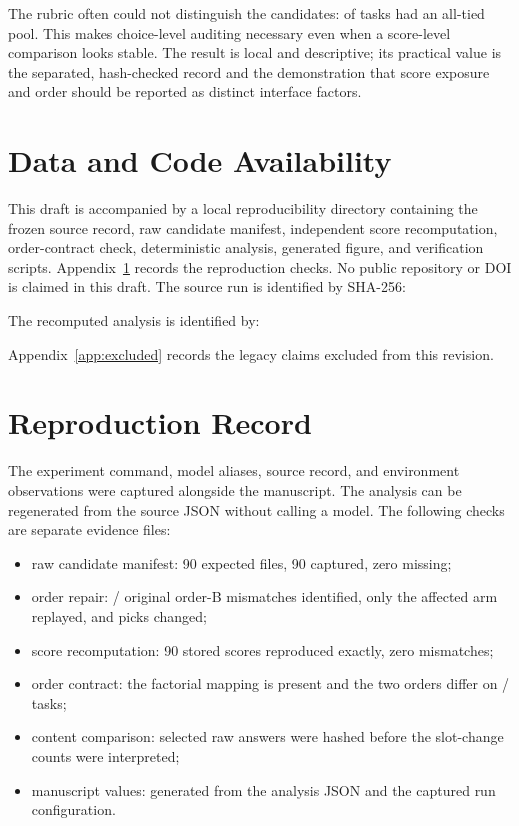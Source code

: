 \documentclass[11pt]{article}
\begin{document}
The rubric often could not distinguish the candidates: \AllTiedInstrumentTasks{} of
\DesignTasks{} tasks had an all-tied pool. This makes choice-level auditing necessary even when a
score-level comparison looks stable. The result is local and descriptive; its practical value is the
separated, hash-checked record and the demonstration that score exposure and order should be reported
as distinct interface factors.

\section*{Data and Code Availability}

This draft is accompanied by a local reproducibility directory containing the frozen source record,
raw candidate manifest, independent score recomputation, order-contract check, deterministic
analysis, generated figure, and verification scripts. Appendix~\ref{app:repro} records the
reproduction checks. No public repository or DOI is claimed in this draft. The source run is
identified by SHA-256:
\begin{flushleft}\ttfamily\small\SourceDigest\end{flushleft}
The recomputed analysis is identified by:
\begin{flushleft}\ttfamily\small\AnalysisDigest\end{flushleft}
Appendix~\ref{app:excluded} records the legacy claims excluded from this revision.

\appendix

\section{Reproduction Record}\label{app:repro}

The experiment command, model aliases, source record, and environment observations were captured
alongside the manuscript. The analysis can be regenerated from the source JSON without calling a
model. The following checks are separate evidence files:

\begin{itemize}
\item raw candidate manifest: 90 expected files, 90 captured, zero missing;
\item order repair: \OriginalHardOrderMismatchTasks/\DesignTasks{} original order-B mismatches
  identified, only the affected arm replayed, and \HardRepairPickChangedTasks{} picks changed;
\item score recomputation: 90 stored scores reproduced exactly, zero mismatches;
\item order contract: the factorial mapping is present and the two orders differ on
  \OrderContractDiffer/\DesignTasks{} tasks;
\item content comparison: selected raw answers were hashed before the slot-change counts were
  interpreted;
\item manuscript values: generated from the analysis JSON and the captured run configuration.
\end{itemize}
\end{document}
